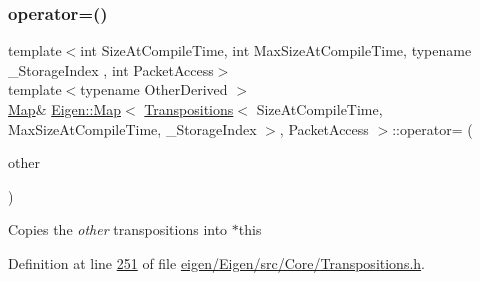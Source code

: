 \mbox{\label{class_eigen_1_1_map_3_01_transpositions_3_01_size_at_compile_time_00_01_max_size_at_compile_timecc993082d7c0ba51ca94b27e97da8dd3_a903d189a8b363033ec9b1cba0190b11b}} 
\subsubsection{\texorpdfstring{operator=()}{operator=()}\hspace{0.1cm}{\footnotesize\ttfamily [2/4]}}
{\footnotesize\ttfamily template$<$int Size\+At\+Compile\+Time, int Max\+Size\+At\+Compile\+Time, typename \+\_\+\+Storage\+Index , int Packet\+Access$>$ \\
template$<$typename Other\+Derived $>$ \\
\hyperlink{group___core___module_class_eigen_1_1_map}{Map}\& \hyperlink{group___core___module_class_eigen_1_1_map}{Eigen\+::\+Map}$<$ \hyperlink{group___core___module_class_eigen_1_1_transpositions}{Transpositions}$<$ Size\+At\+Compile\+Time, Max\+Size\+At\+Compile\+Time, \+\_\+\+Storage\+Index $>$, Packet\+Access $>$\+::operator= (\begin{DoxyParamCaption}\item[{const \hyperlink{class_eigen_1_1_transpositions_base}{Transpositions\+Base}$<$ Other\+Derived $>$ \&}]{other }\end{DoxyParamCaption})\hspace{0.3cm}{\ttfamily [inline]}}

Copies the {\itshape other} transpositions into {\ttfamily $\ast$this} 

Definition at line \hyperlink{eigen_2_eigen_2src_2_core_2_transpositions_8h_source_l00251}{251} of file \hyperlink{eigen_2_eigen_2src_2_core_2_transpositions_8h_source}{eigen/\+Eigen/src/\+Core/\+Transpositions.\+h}.

